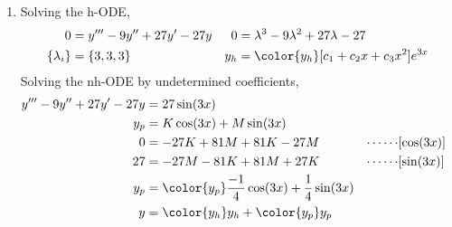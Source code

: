 \begin{enumerate}
    \item Solving the h-ODE,
          \begin{align}
              0               & = y''' - 9y'' + 27y' - 27y                     &
              0               & = \lambda^{3}  - 9\lambda^{2} + 27\lambda - 27   \\
              \{\lambda_{i}\} & = \{3, 3, 3\}                                  &
              y_{h}           & = \color{y_h} [c_1 + c_2 x + c_3 x^{2}] e^{3x}
          \end{align}
          Solving the nh-ODE by undetermined coefficients,
          \begin{align}
              y''' - 9y'' + 27y' - 27y & = 27\sin(3x)                                  \\
              y_{p}                    & = K\cos(3x) + M\sin(3x)                       \\
              0                        & = -27K + 81M + 81K - 27M                    &
              \cdots\cdots             & [\cos(3x)]                                    \\
              27                       & = -27M - 81K + 81M + 27K                    &
              \cdots\cdots             & [\sin(3x)]                                    \\
              y_{p}                    & = \color{y_p} \frac{-1}{4}\cos(3x)
              + \frac{1}{4}\sin(3x)                                                    \\
              y                        & = {\color{y_h} y_{h}} + {\color{y_p} y_{p}}
          \end{align}


\end{enumerate}
